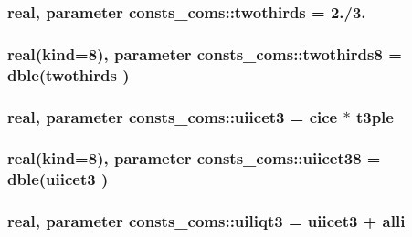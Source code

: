 \subsubsection[{\texorpdfstring{twothirds}{twothirds}}]{\setlength{\rightskip}{0pt plus 5cm}real, parameter consts\+\_\+coms\+::twothirds = 2./3.}\hypertarget{namespaceconsts__coms_a7ac856e6d8ab0454fcd39dce6cd2ea71}{}\label{namespaceconsts__coms_a7ac856e6d8ab0454fcd39dce6cd2ea71}
\subsubsection[{\texorpdfstring{twothirds8}{twothirds8}}]{\setlength{\rightskip}{0pt plus 5cm}real(kind=8), parameter consts\+\_\+coms\+::twothirds8 = dble({\bf twothirds} )}\hypertarget{namespaceconsts__coms_a9e055a545c5ace049296c3a15aa12b83}{}\label{namespaceconsts__coms_a9e055a545c5ace049296c3a15aa12b83}
\subsubsection[{\texorpdfstring{uiicet3}{uiicet3}}]{\setlength{\rightskip}{0pt plus 5cm}real, parameter consts\+\_\+coms\+::uiicet3 = {\bf cice} $\ast$ {\bf t3ple}}\hypertarget{namespaceconsts__coms_a4acdb50399e47f446b674d2ba133e667}{}\label{namespaceconsts__coms_a4acdb50399e47f446b674d2ba133e667}
\subsubsection[{\texorpdfstring{uiicet38}{uiicet38}}]{\setlength{\rightskip}{0pt plus 5cm}real(kind=8), parameter consts\+\_\+coms\+::uiicet38 = dble({\bf uiicet3} )}\hypertarget{namespaceconsts__coms_a93bb3f6b23cdf15d90094bd2ba30ad8a}{}\label{namespaceconsts__coms_a93bb3f6b23cdf15d90094bd2ba30ad8a}
\subsubsection[{\texorpdfstring{uiliqt3}{uiliqt3}}]{\setlength{\rightskip}{0pt plus 5cm}real, parameter consts\+\_\+coms\+::uiliqt3 = {\bf uiicet3} + {\bf alli}}\hypertarget{namespaceconsts__coms_ab5c64cd18c9e5fddc92d34cbe5a75192}{}\label{namespaceconsts__coms_ab5c64cd18c9e5fddc92d34cbe5a75192}
